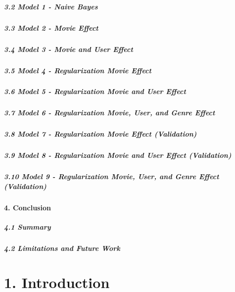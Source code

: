 \documentclass[]{article}
\let\oldparagraph\paragraph
\renewcommand{\paragraph}[1]{\oldparagraph{#1}\mbox{}}
\let\oldsubparagraph\subparagraph
\renewcommand{\subparagraph}[1]{\oldsubparagraph{#1}\mbox{}}
\begin{document}
\hypertarget{model-1---naive-bayes}{%
\subparagraph{3.2 Model 1 - Naive Bayes}\label{model-1---naive-bayes}}

\hypertarget{model-2---movie-effect}{%
\subparagraph{3.3 Model 2 - Movie Effect}\label{model-2---movie-effect}}

\hypertarget{model-3---movie-and-user-effect}{%
\subparagraph{3.4 Model 3 - Movie and User
Effect}\label{model-3---movie-and-user-effect}}

\hypertarget{model-4---regularization-movie-effect}{%
\subparagraph{3.5 Model 4 - Regularization Movie
Effect}\label{model-4---regularization-movie-effect}}

\hypertarget{model-5---regularization-movie-and-user-effect}{%
\subparagraph{3.6 Model 5 - Regularization Movie and User
Effect}\label{model-5---regularization-movie-and-user-effect}}

\hypertarget{model-6---regularization-movie-user-and-genre-effect}{%
\subparagraph{3.7 Model 6 - Regularization Movie, User, and Genre
Effect}\label{model-6---regularization-movie-user-and-genre-effect}}

\hypertarget{model-7---regularization-movie-effect-validation}{%
\subparagraph{3.8 Model 7 - Regularization Movie Effect
(Validation)}\label{model-7---regularization-movie-effect-validation}}

\hypertarget{model-8---regularization-movie-and-user-effect-validation}{%
\subparagraph{3.9 Model 8 - Regularization Movie and User Effect
(Validation)}\label{model-8---regularization-movie-and-user-effect-validation}}

\hypertarget{model-9---regularization-movie-user-and-genre-effect-validation}{%
\subparagraph{3.10 Model 9 - Regularization Movie, User, and Genre
Effect
(Validation)}\label{model-9---regularization-movie-user-and-genre-effect-validation}}

\hypertarget{conclusion}{%
\paragraph{4. Conclusion}\label{conclusion}}

\hypertarget{summary}{%
\subparagraph{4.1 Summary}\label{summary}}

\hypertarget{limitations-and-future-work}{%
\subparagraph{4.2 Limitations and Future
Work}\label{limitations-and-future-work}}

\hypertarget{introduction-1}{%
\section{1. Introduction}\label{introduction-1}}
\end{document}
